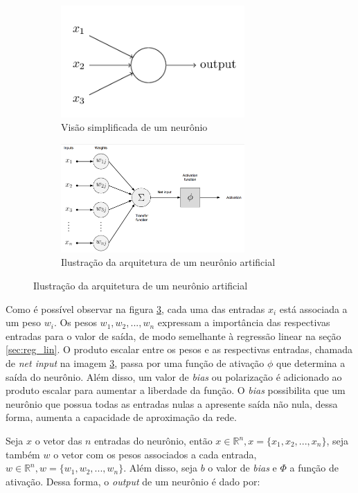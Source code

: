 \begin{figure}[H] 
  \centering
  \begin{subfigure}{7cm}
    \centering 
    \includegraphics[width=7cm]{../figuras/perceptron-simples.png}
    \caption{Visão simplificada de um neurônio \cite{deeplearningbook}}
    \label{fig:perceptron-simples}
  \end{subfigure}
  \hfill
  \begin{subfigure}{7cm}
    \centering
    \includegraphics[width=7cm]{../figuras/perceptron.png}
    \caption{Ilustração da arquitetura de um 
    neurônio artificial \cite{dl-oreilly}}
    \label{fig:perceptron}
  \end{subfigure}
\end{figure}

Como é possível observar na figura \ref{fig:perceptron}, cada
uma das entradas $x_i$ está associada a um peso $w_i$. Os pesos
$w_1, w_2, ..., w_n$ expressam a importância das respectivas
entradas para o valor de saída, de modo semelhante à 
regressão linear na seção \ref{sec:reg_lin}. O produto escalar entre
os pesos e as respectivas entradas, chamada de \textit{net input}
na imagem \ref{fig:perceptron}, passa por uma função de 
ativação $\phi$ que determina a saída do neurônio. 
Além disso, um valor de \textit{bias} ou polarização é
adicionado ao produto escalar para aumentar a liberdade 
da função. O \textit{bias} possibilita que 
um neurônio que possua todas as entradas nulas a 
apresente saída não nula, dessa forma,
aumenta a capacidade de aproximação da rede. 
\cite{deeplearningbook}


Seja $x$ o vetor das $n$ entradas do neurônio, então
$x \in \mathbb{R}^n, x=\{x_1, x_2, ..., x_n\}$, seja também 
$w$ o vetor com os pesos associados a cada entrada, 
$w \in \mathbb{R}^n, w=\{w_1, w_2, ..., w_n\}$. Além disso,
seja $b$ o valor de \textit{bias} e $\Phi$ a função de ativação.
Dessa forma, o \textit{output} de um neurônio é dado por:
 

